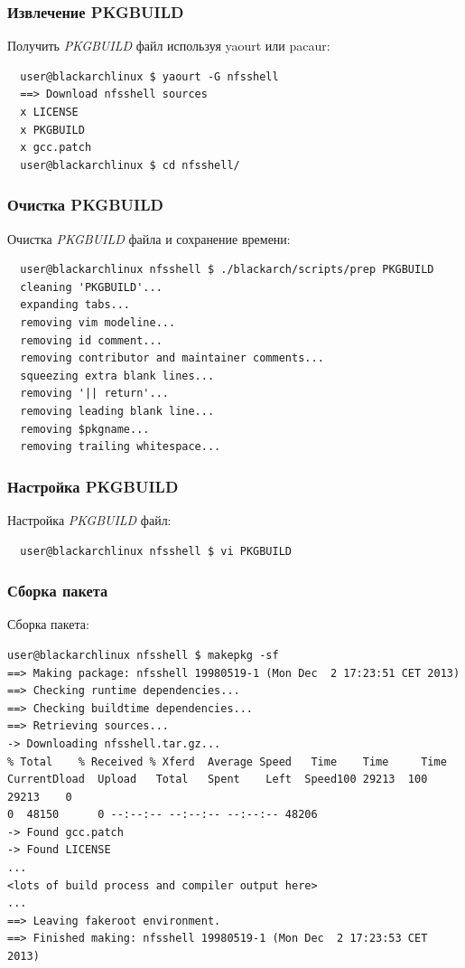 \documentclass[a4paper, oneside, 11pt]{book}
\begin{document}
\subsubsection{Извлечение PKGBUILD}
Получить \textit{PKGBUILD} файл используя yaourt или pacaur:
\begin{lstlisting}
  user@blackarchlinux $ yaourt -G nfsshell
  ==> Download nfsshell sources
  x LICENSE
  x PKGBUILD
  x gcc.patch
  user@blackarchlinux $ cd nfsshell/
\end{lstlisting}

\subsubsection{Очистка PKGBUILD}
Очистка \textit{PKGBUILD} файла и сохранение времени:
\begin{lstlisting}
  user@blackarchlinux nfsshell $ ./blackarch/scripts/prep PKGBUILD
  cleaning 'PKGBUILD'...
  expanding tabs...
  removing vim modeline...
  removing id comment...
  removing contributor and maintainer comments...
  squeezing extra blank lines...
  removing '|| return'...
  removing leading blank line...
  removing $pkgname...
  removing trailing whitespace...
\end{lstlisting}

\subsubsection{Настройка PKGBUILD}
Настройка \textit{PKGBUILD} файл:
\begin{lstlisting}
  user@blackarchlinux nfsshell $ vi PKGBUILD
\end{lstlisting}

\subsubsection{Сборка пакета}
Сборка пакета:
\begin{lstlisting}user@blackarchlinux nfsshell $ makepkg -sf
==> Making package: nfsshell 19980519-1 (Mon Dec  2 17:23:51 CET 2013)
==> Checking runtime dependencies...
==> Checking buildtime dependencies...
==> Retrieving sources...
-> Downloading nfsshell.tar.gz...
% Total    % Received % Xferd  Average Speed   Time    Time     Time
CurrentDload  Upload   Total   Spent    Left  Speed100 29213  100 29213    0
0  48150      0 --:--:-- --:--:-- --:--:-- 48206
-> Found gcc.patch
-> Found LICENSE
...
<lots of build process and compiler output here>
...
==> Leaving fakeroot environment.
==> Finished making: nfsshell 19980519-1 (Mon Dec  2 17:23:53 CET 2013)
\end{lstlisting}
\end{document}

